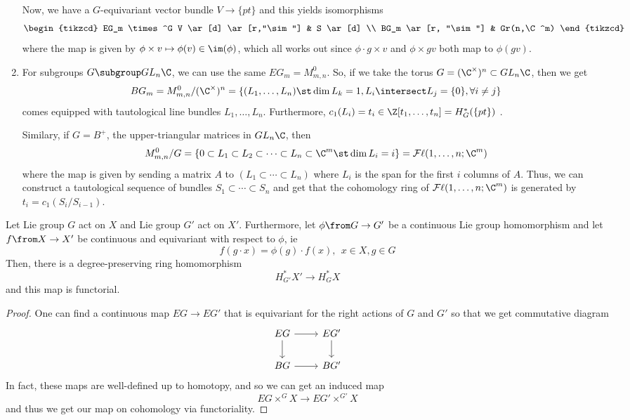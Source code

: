 \documentclass[11pt,leqno,oneside]{amsbook}
\numberwithin{thm}{section}
\newcommand{\Fl}{\mathcal{F\ell}}
\newcommand{\Gr}{Gr}
\begin{document}
\begin{example}
\begin{enumerate}
    Now, we have a \(G\)-equivariant vector bundle \(V \to \{pt\}\)
    and this yields isomorphisms \[
      \begin{tikzcd}
        EG_m \times^G V \ar[d] \ar[r,"\sim"] & S \ar[d] \\
        BG_m \ar[r, "\sim"] & \Gr(n,\C^m)
      \end{tikzcd}
    \]
    where the map is given by \(\phi \times v \mapsto \phi(v) \in
    \im(\phi)\), which all works out since \(\phi \cdot g \times v\)
    and \(\phi \times gv\) both map to \(\phi(gv)\).
  \item For subgroups \(G \subgroup GL_n \C\), we can use the same
    \(EG_m = M_{m,n}^0\). So, if we take the torus \(G = (\C^\times)^n \subset
    GL_n \C\), then we get \[
      BG_m = M_{m,n}^0 / (\C^\times)^n = \left\{ (L_1, \ldots, L_n)
        \st \dim L_k = 1, L_i \intersect L_j = \{0\}, \forall i \neq j
        \right\} 
    \]
    comes equipped with tautological line bundles \(L_1,\ldots,
    L_n\). Furthermore, \(c_1(L_i) = t_i \in \Z[t_1, \ldots, t_n] =
    H^*_G(\{pt\})\) .

    Similary, if \(G = B^+\), the upper-triangular matrices in
    \(GL_n\C\), then \[
      M_{m,n}^0/G = \{0 \subset L_1 \subset L_2 \subset \cdots \subset
      L_n \subset \C^m \st \dim L_i = i\} = \Fl(1,\ldots,n;\C^m)
    \]
    where the map is given by sending a matrix \(A\) to \((L_1 \subset
    \cdots \subset L_n)\) where \(L_i\) is the span for the first
    \(i\) columns of \(A\). Thus, we can construct a tautological
    sequence of bundles \(S_1 \subset \cdots \subset S_n\) and
    get that the cohomology ring of \(\Fl(1, \ldots, n; \C^m)\) is
    generated by \(t_i = c_1(S_i/S_{i-1})\). 
  \end{enumerate}
\end{example}
\begin{prop}
  Let Lie group \(G\) act on \(X\) and Lie group \(G'\) act on
  \(X'\). Furthermore, let \(\phi \from G \to G'\) be a continuous Lie
  group homomorphism and let \(f \from X \to X'\) be continuous and
  equivariant with respect to \(\phi\), ie \[
    f(g \cdot x) = \phi(g) \cdot f(x), \ \ x \in X, g \in G
  \]
  Then, there is a degree-preserving ring homomorphism \[
    H_{G'}^* X' \to H_G^* X
  \]
  and this map is functorial.
\end{prop}
\begin{proof}
  One can find a continuous map \(EG \to EG'\)  that is equivariant
  for the right actions of \(G\) and \(G'\) so that we get commutative
  diagram \[
    \begin{tikzcd}
      EG \ar[d]\ar[r] & EG' \ar[d]\\
      BG \ar[r] & BG'
    \end{tikzcd}
  \]
  In fact, these maps are well-defined up to homotopy, and so we can
  get an induced map \[
    EG \times^G X \to EG' \times^{G'} X
  \]
  and thus we get our map on cohomology via functoriality. 
\end{proof}
\end{document}
